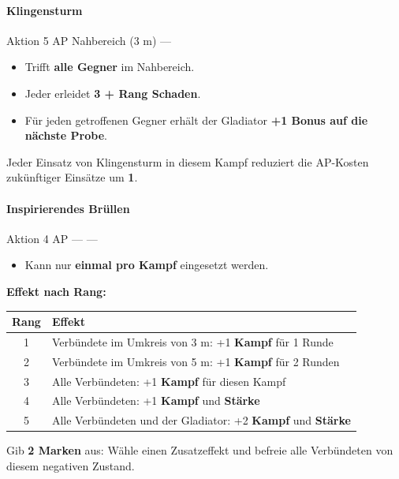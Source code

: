 \paragraph*{Klingensturm}

\skillcard
{}
{Aktion}
{5 AP}
{Nahbereich (3 m)}
{—}
{
	\begin{itemize}
		\item Trifft \textbf{alle Gegner} im Nahbereich.
		\item Jeder erleidet \textbf{3 + Rang Schaden}.
		\item Für jeden getroffenen Gegner erhält der Gladiator
		\textbf{+1 Bonus auf die nächste Probe}.
	\end{itemize}
}
{
	Jeder Einsatz von Klingensturm in diesem Kampf reduziert
	die AP-Kosten zukünftiger Einsätze um \textbf{1}.
}

\paragraph*{Inspirierendes Brüllen}

\skillcard
{}
{Aktion}
{4 AP}
{—}
{—}
{
	\begin{itemize}
		\item Kann nur \textbf{einmal pro Kampf} eingesetzt werden.
	\end{itemize}
	
	\medskip
	\textbf{Effekt nach Rang:}
	
	\begin{center}
		\begin{tabular}{cl}
			\toprule
			\textbf{Rang} & \textbf{Effekt} \\
			\midrule
			1 & Verbündete im Umkreis von 3 m: +1 \textbf{Kampf} für 1 Runde \\
			2 & Verbündete im Umkreis von 5 m: +1 \textbf{Kampf} für 2 Runden \\
			3 & Alle Verbündeten: +1 \textbf{Kampf} für diesen Kampf \\
			4 & Alle Verbündeten: +1 \textbf{Kampf} und \textbf{Stärke} \\
			5 & Alle Verbündeten und der Gladiator:
			+2 \textbf{Kampf} und \textbf{Stärke} \\
			\bottomrule
		\end{tabular}
	\end{center}
}
{
	Gib \textbf{2 Marken} aus:
	Wähle einen Zusatzeffekt und befreie alle Verbündeten
	von diesem negativen Zustand.
}

